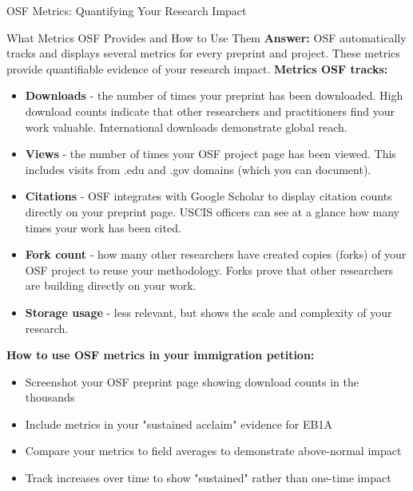 \documentclass[11pt]{beamer}
\begin{document}
	\begin{frame}{OSF Metrics: Quantifying Your Research Impact}
		\scriptsize
		\begin{block}{What Metrics OSF Provides and How to Use Them}
			\textbf{Answer:} OSF automatically tracks and displays several metrics for every preprint and project. These metrics provide quantifiable evidence of your research impact.
			\vspace{0.1cm}
			\textbf{Metrics OSF tracks:}
			\begin{itemize}
				\item \textbf{Downloads} - the number of times your preprint has been downloaded. High download counts indicate that other researchers and practitioners find your work valuable. International downloads demonstrate global reach.
				\item \textbf{Views} - the number of times your OSF project page has been viewed. This includes visits from .edu and .gov domains (which you can document).
				\item \textbf{Citations} - OSF integrates with Google Scholar to display citation counts directly on your preprint page. USCIS officers can see at a glance how many times your work has been cited.
				\item \textbf{Fork count} - how many other researchers have created copies (forks) of your OSF project to reuse your methodology. Forks prove that other researchers are building directly on your work.
				\item \textbf{Storage usage} - less relevant, but shows the scale and complexity of your research.
			\end{itemize}
			\textbf{How to use OSF metrics in your immigration petition:}
			\begin{itemize}
				\item Screenshot your OSF preprint page showing download counts in the thousands
				\item Include metrics in your "sustained acclaim" evidence for EB1A
				\item Compare your metrics to field averages to demonstrate above-normal impact
				\item Track increases over time to show "sustained" rather than one-time impact
			\end{itemize}
		\end{block}
	\end{frame}
	
\end{document}
